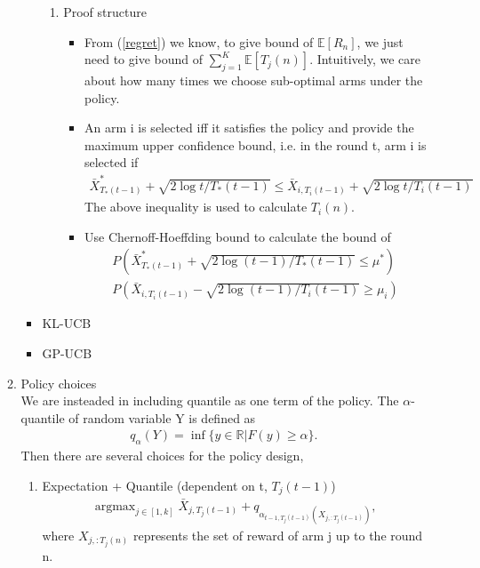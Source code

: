\documentclass{article}
\DeclareMathOperator*{\argmax}{argmax}
\begin{document}
\begin{enumerate}
\begin{enumerate}
\begin{itemize}
\begin{enumerate}
                \item Proof structure\\
                    \begin{itemize}
                        \item From (\ref{regret}) we know, to give bound of $\mathbb{E}[R_n]$, we just need to give bound of $\sum_{j=1}^K \mathbb{E}[T_j(n)]$. Intuitively, we care about how many times we choose sub-optimal arms under the policy.
                        \item An arm i is selected iff it satisfies the policy and provide the maximum upper confidence bound, i.e. in the round t, arm i is selected if
                            \begin{align}
                                 \bar{X}^\ast_{T_{\ast}(t-1)} + \sqrt{2 \log t/ T_\ast(t-1)} \leq \bar{X}_{i, T_i(t-1)} + \sqrt{2 \log t/ T_i(t-1)}
                            \end{align}
                        The above inequality is used to calculate $T_i(n)$. 
                        \item Use Chernoff-Hoeffding bound to calculate the bound of 
                        \begin{align}
                            P(\bar{X}^\ast_{T_{\ast}(t-1)} + \sqrt{2 \log (t-1)/ T_\ast(t-1)} \leq \mu^\ast)\\
                            P(\bar{X}_{i, T_i(t-1)} - \sqrt{2 \log (t-1)/ T_i(t-1)} \geq \mu_i)
                        \end{align}
                    \end{itemize}
                    
            \end{enumerate}
        \item KL-UCB
        \item GP-UCB
    \end{itemize}
    
    \item Policy choices\\
        We are insteaded in including quantile as one term of the policy. The $\alpha$-quantile of random variable Y is defined as
        \begin{align}
            q_\alpha(Y) = \inf\{y \in \mathbb{R}| F(y) \geq \alpha\}.
        \end{align}
        Then there are several choices for the policy design,\\
        \begin{enumerate}
        \item Expectation + Quantile (dependent on t, $T_j(t-1)$)
        \begin{align}
        \argmax_{j \in [1,k]} \bar{X}_{j,T_j(t-1)} + q_{\alpha_{t-1, T_j(t-1)}(X_{j,:T_j(t-1)})},
        \end{align}
        where $X_{j,:T_j(n)}$ represents the set of reward of arm j up to the round n.\\
        

\end{enumerate}
\end{enumerate}
\end{enumerate}
\end{document}

